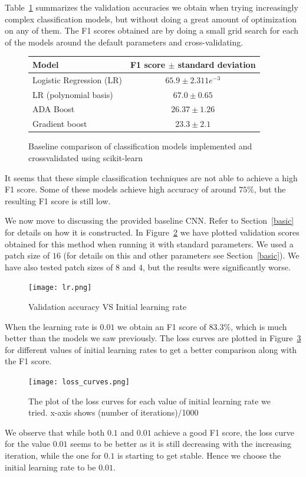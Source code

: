 \documentclass[10pt,conference,compsocconf]{IEEEtran}
\begin{document}
Table~\ref{baseline} summarizes the validation accuracies we obtain when trying increasingly complex classification models, but without doing a great amount of optimization on any of them. The F1 scores obtained are by doing a small grid search for each of the models around the default parameters and cross-validating. 
\begin{figure}[h!]
\center
\begin{tabular}{ l | c  }
  Model & F1 score $\pm$ standard deviation  \\
  \hline
  Logistic Regression (LR) & $65.9 \pm 2.311e^{-3}$  \\
  LR (polynomial basis) & $67.0 \pm 0.65$  \\
  ADA Boost & $26.37 \pm 1.26$ \\
  Gradient boost & $23.3 \pm 2.1$
\end{tabular}
\caption{Baseline comparison of classification models implemented and crossvalidated using scikit-learn}
\label{baseline}
\end{figure}
It seems that these simple classification techniques are not able to achieve a high F1 score. Some of these models achieve high accuracy of around $75\%$, but the resulting F1 score is still low.

We now move to discussing the provided baseline CNN. Refer to Section~\ref{basic} for details on how it is constructed.  In Figure~\ref{lr} we have plotted validation scores obtained for this method when running it with standard parameters. We used a patch size of $16$ (for details on this and other parameters see Section~\ref{basic}). We have also tested patch sizes of $8$ and $4$, but the results were significantly worse.
\begin{figure}
 \center
 \texttt{[image: lr.png]}
 \caption{Validation accuracy VS Initial learning rate}
 \label{lr}
\end{figure}

When the learning rate is $0.01$ we obtain an F1 score of $83.3\%$, which is much better than the models we saw previously. The loss curves are plotted in Figure~\ref{loss} for different values of initial learning rates to get a better comparison along with the F1 score.  
\begin{figure}
 \center
 \texttt{[image: loss\_curves.png]}
 \caption{The plot of the loss curves for each value of initial learning rate we tried. x-axis shows (number of iterations)/1000}
 \label{loss}
\end{figure}
We observe that while both $0.1$ and $0.01$ achieve a good F1 score, the loss curve for the value $0.01$ seems to be better as it is still decreasing with the increasing iteration, while the one for $0.1$ is starting to get stable. Hence we choose the initial learning rate to be $0.01$.
\end{document}
